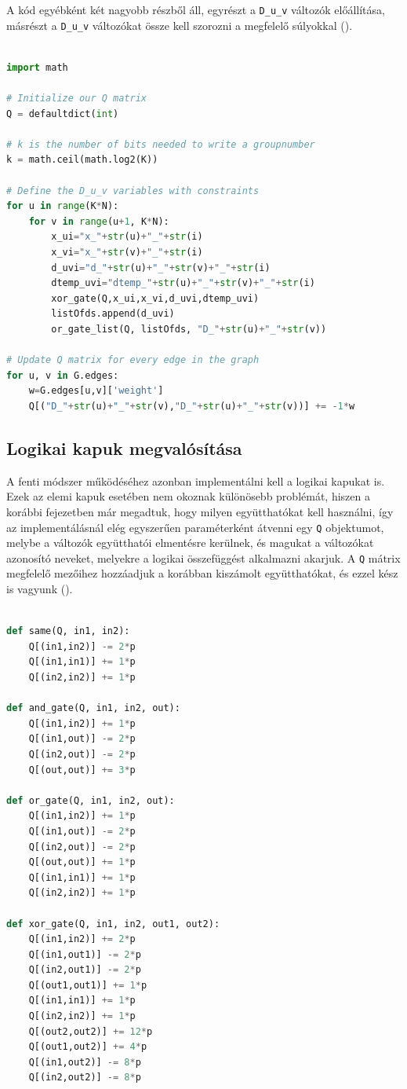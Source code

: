 A kód egyébként két nagyobb részből áll, egyrészt a \verb+D_u_v+ változók előállítása, másrészt a  \verb+D_u_v+ változókat össze kell szorozni a megfelelő súlyokkal ().

\begin{lstlisting}[language=python,caption=Maximális K-vágás QUBO (bináris kódolás),label=code:maxKCutQUBOBinary]

import math

# Initialize our Q matrix
Q = defaultdict(int)

# k is the number of bits needed to write a groupnumber
k = math.ceil(math.log2(K))

# Define the D_u_v variables with constraints
for u in range(K*N):
	for v in range(u+1, K*N):
		x_ui="x_"+str(u)+"_"+str(i)
		x_vi="x_"+str(v)+"_"+str(i)
		d_uvi="d_"+str(u)+"_"+str(v)+"_"+str(i)
		dtemp_uvi="dtemp_"+str(u)+"_"+str(v)+"_"+str(i)
		xor_gate(Q,x_ui,x_vi,d_uvi,dtemp_uvi)
		listOfds.append(d_uvi)
		or_gate_list(Q, listOfds, "D_"+str(u)+"_"+str(v))

# Update Q matrix for every edge in the graph
for u, v in G.edges:
	w=G.edges[u,v]['weight']
	Q[("D_"+str(u)+"_"+str(v),"D_"+str(u)+"_"+str(v))] += -1*w

\end{lstlisting}

\subsection{Logikai kapuk megvalósítása}

A fenti módszer működéséhez azonban implementálni kell a logikai kapukat is.
Ezek az elemi kapuk esetében nem okoznak különösebb problémát, hiszen a korábbi fejezetben már megadtuk, hogy milyen együtthatókat kell használni, így az implementálásnál elég egyszerűen paraméterként átvenni egy \verb+Q+ objektumot, melybe a változók együtthatói elmentésre kerülnek, és magukat a változókat azonosító neveket, melyekre a logikai összefüggést alkalmazni akarjuk. A \verb+Q+ mátrix megfelelő mezőihez hozzáadjuk a korábban kiszámolt együtthatókat, és ezzel kész is vagyunk ().

\begin{lstlisting}[language=python,caption=Elemi kapuk,label=code:ElementaryGates]
	
def same(Q, in1, in2):
	Q[(in1,in2)] -= 2*p
	Q[(in1,in1)] += 1*p
	Q[(in2,in2)] += 1*p

def and_gate(Q, in1, in2, out):
	Q[(in1,in2)] += 1*p
	Q[(in1,out)] -= 2*p
	Q[(in2,out)] -= 2*p
	Q[(out,out)] += 3*p

def or_gate(Q, in1, in2, out):
	Q[(in1,in2)] += 1*p
	Q[(in1,out)] -= 2*p
	Q[(in2,out)] -= 2*p
	Q[(out,out)] += 1*p
	Q[(in1,in1)] += 1*p
	Q[(in2,in2)] += 1*p

def xor_gate(Q, in1, in2, out1, out2):
	Q[(in1,in2)] += 2*p
	Q[(in1,out1)] -= 2*p
	Q[(in2,out1)] -= 2*p
	Q[(out1,out1)] += 1*p
	Q[(in1,in1)] += 1*p
	Q[(in2,in2)] += 1*p
	Q[(out2,out2)] += 12*p
	Q[(out1,out2)] += 4*p
	Q[(in1,out2)] -= 8*p
	Q[(in2,out2)] -= 8*p
	
\end{lstlisting}

